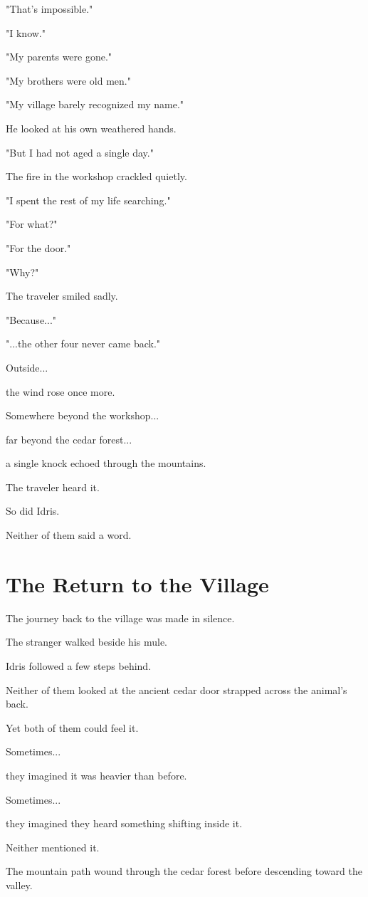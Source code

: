 \documentclass[12pt,openany]{book}
\begin{document}
"That's impossible."

"I know."

"My parents were gone."

"My brothers were old men."

"My village barely recognized my name."

He looked at his own weathered hands.

"But I had not aged a single day."

The fire in the workshop crackled quietly.

"I spent the rest of my life searching."

"For what?"

"For the door."

"Why?"

The traveler smiled sadly.

"Because..."

"...the other four never came back."

Outside...

the wind rose once more.

Somewhere beyond the workshop...

far beyond the cedar forest...

a single knock echoed through the mountains.

The traveler heard it.

So did Idris.

Neither of them said a word.
\section*{The Return to the Village}

The journey back to the village was made in silence.

The stranger walked beside his mule.

Idris followed a few steps behind.

Neither of them looked at the ancient cedar door strapped across the animal's back.

Yet both of them could feel it.

Sometimes...

they imagined it was heavier than before.

Sometimes...

they imagined they heard something shifting inside it.

Neither mentioned it.

The mountain path wound through the cedar forest before descending toward the valley.
\end{document}
